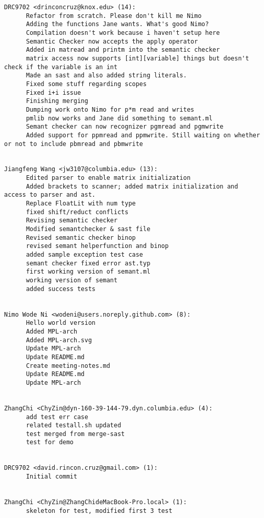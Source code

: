 \begin{lstlisting}
DRC9702 <drinconcruz@knox.edu> (14):
      Refactor from scratch. Please don't kill me Nimo
      Adding the functions Jane wants. What's good Nimo?
      Compilation doesn't work because i haven't setup here
      Semantic Checker now accepts the apply operator
      Added in matread and printm into the semantic checker
      matrix access now supports [int][variable] things but doesn't check if the variable is an int
      Made an sast and also added string literals.
      Fixed some stuff regarding scopes
      Fixed i+i issue
      Finishing merging
      Dumping work onto Nimo for p*m read and writes
      pmlib now works and Jane did something to semant.ml
      Semant checker can now recognizer pgmread and pgmwrite
      Added support for ppmread and ppmwrite. Still waiting on whether or not to include pbmread and pbmwrite


Jiangfeng Wang <jw3107@columbia.edu> (13):
      Edited parser to enable matrix initialization
      Added brackets to scanner; added matrix initialization and access to parser and ast.
      Replace FloatLit with num type
      fixed shift/reduct conflicts
      Revising semantic checker
      Modified semantchecker & sast file
      Revised semantic checker binop
      revised semant helperfunction and binop
      added sample exception test case
      semant checker fixed error ast.typ
      first working version of semant.ml
      working version of semant
      added success tests


Nimo Wode Ni <wodeni@users.noreply.github.com> (8):
      Hello world version
      Added MPL-arch
      Added MPL-arch.svg
      Update MPL-arch
      Update README.md
      Create meeting-notes.md
      Update README.md
      Update MPL-arch


ZhangChi <ChyZin@dyn-160-39-144-79.dyn.columbia.edu> (4):
      add test err case
      related testall.sh updated
      test merged from merge-sast
      test for demo


DRC9702 <david.rincon.cruz@gmail.com> (1):
      Initial commit


ZhangChi <ChyZin@ZhangChideMacBook-Pro.local> (1):
      skeleton for test, modified first 3 test


\end{lstlisting}

\clearpage
